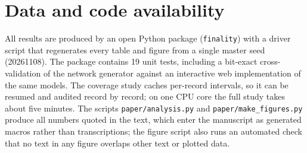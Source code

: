 \documentclass[11pt]{article}
\theoremstyle{plain}
\theoremstyle{definition}
\theoremstyle{remark}
\begin{document}







\section*{Data and code availability}
All results are produced by an open Python package (\texttt{finality}) with a driver script that regenerates every table and figure from a single master seed (20261108). The package contains 19 unit tests, including a bit-exact cross-validation of the network generator against an interactive web implementation of the same models. The coverage study caches per-record intervals, so it can be resumed and audited record by record; on one CPU core the full study takes about five minutes. The scripts \texttt{paper/analysis.py} and \texttt{paper/make\_figures.py} produce all numbers quoted in the text, which enter the manuscript as generated macros rather than transcriptions; the figure script also runs an automated check that no text in any figure overlaps other text or plotted data.




\appendix

\end{document}
